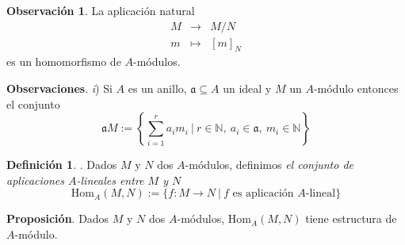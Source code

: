 \documentclass[a4paper,12pt]{article}
\newcommand{\N}{\mathbb{N}}
\newcommand{\af}{\mathfrak{a}}
\newcommand{\Hom}{\text{Hom}}
\theoremstyle{definition}
\newtheorem{definition}[theorem]{Definición}
\newtheorem{remark}[theorem]{Observación}
\begin{document}
\begin{remark} La aplicación natural
$$\begin{array}{rcl}
    M&\longrightarrow&M/N\\
    m&\longmapsto&[m]_N
\end{array}$$
es un homomorfismo de $A$-módulos.
\end{remark}

\textbf{Observaciones}. \textit{i}) Si $A$ es un anillo, $\af\subseteq A$ un ideal y $M$ un $A$-módulo entonces el conjunto$$\af M:=\left\{\sum_{i=1}^ra_im_i\ |\ r\in\N,\ a_i\in\af,\ m_i\in\N\right\}$$

\begin{definition}. Dados $M$ y $N$ dos $A$-módulos, definimos \textit{el conjunto de aplicaciones $A$-lineales entre $M$ y $N$}
$$\Hom_A(M,N):=\{f:M\longrightarrow N\ |\ f\text{ es aplicación }A\text{-lineal}\}
$$
\end{definition}
\textbf{Proposición}. Dados $M$ y $N$ dos $A$-módulos, $\Hom_A(M,N)$ tiene estructura de $A$-módulo.
\end{document}
